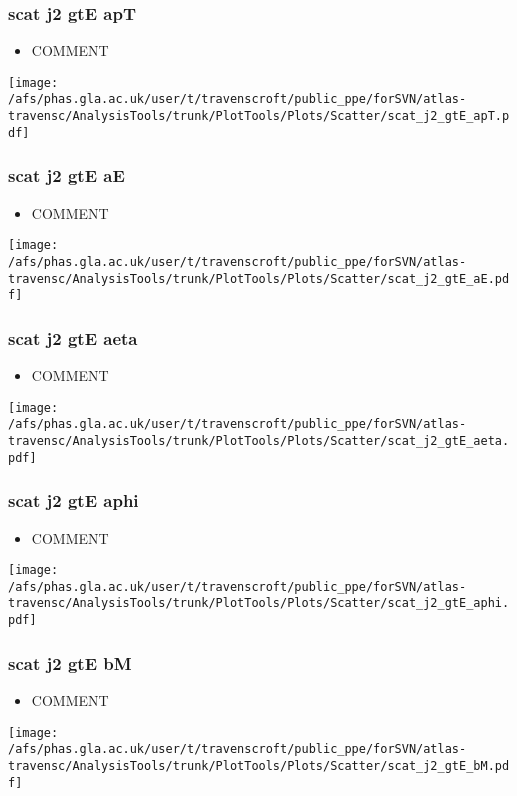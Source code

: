 \documentclass{beamer}
\begin{document}
\begin{frame}
\frametitle{scat j2 gtE apT}
\begin{itemize}
\item COMMENT
\end{itemize}
\begin{center}
\texttt{[image: /afs/phas.gla.ac.uk/user/t/travenscroft/public\_ppe/forSVN/atlas-travensc/AnalysisTools/trunk/PlotTools/Plots/Scatter/scat\_j2\_gtE\_apT.pdf]}
\end{center}
\end{frame}

\begin{frame}
\frametitle{scat j2 gtE aE}
\begin{itemize}
\item COMMENT
\end{itemize}
\begin{center}
\texttt{[image: /afs/phas.gla.ac.uk/user/t/travenscroft/public\_ppe/forSVN/atlas-travensc/AnalysisTools/trunk/PlotTools/Plots/Scatter/scat\_j2\_gtE\_aE.pdf]}
\end{center}
\end{frame}

\begin{frame}
\frametitle{scat j2 gtE aeta}
\begin{itemize}
\item COMMENT
\end{itemize}
\begin{center}
\texttt{[image: /afs/phas.gla.ac.uk/user/t/travenscroft/public\_ppe/forSVN/atlas-travensc/AnalysisTools/trunk/PlotTools/Plots/Scatter/scat\_j2\_gtE\_aeta.pdf]}
\end{center}
\end{frame}

\begin{frame}
\frametitle{scat j2 gtE aphi}
\begin{itemize}
\item COMMENT
\end{itemize}
\begin{center}
\texttt{[image: /afs/phas.gla.ac.uk/user/t/travenscroft/public\_ppe/forSVN/atlas-travensc/AnalysisTools/trunk/PlotTools/Plots/Scatter/scat\_j2\_gtE\_aphi.pdf]}
\end{center}
\end{frame}

\begin{frame}
\frametitle{scat j2 gtE bM}
\begin{itemize}
\item COMMENT
\end{itemize}
\begin{center}
\texttt{[image: /afs/phas.gla.ac.uk/user/t/travenscroft/public\_ppe/forSVN/atlas-travensc/AnalysisTools/trunk/PlotTools/Plots/Scatter/scat\_j2\_gtE\_bM.pdf]}
\end{center}
\end{frame}
\end{document}
